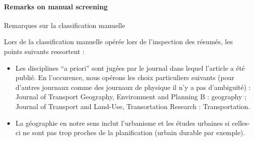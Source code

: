 





\paragraph{Remarks on manual screening}{Remarques sur la classification manuelle}

Lors de la classification manuelle opérée lors de l'inspection des résumés, les points suivants ressortent :

\begin{itemize}
	\item Les disciplines ``a priori'' sont jugées par le journal dans lequel l'article a été publié. En l'occurence, nous opérons les choix particuliers suivants (pour d'autres journaux comme des journaux de physique il n'y a pas d'ambiguïté) : Journal of Transport Geography, Environment and Planning B : geography ; Journal of Transport and Land-Use, Transortation Research : Transportation.
	\item La géographie en notre sens inclut l'urbanisme et les études urbaines si celles-ci ne sont pas trop proches de la planification (urbain durable par exemple).
\end{itemize}







